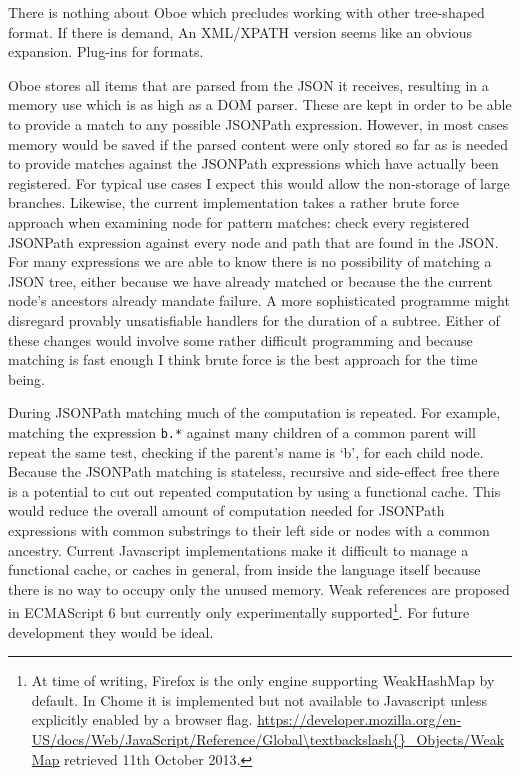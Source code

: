 \documentclass[]{article}
\begin{document}
There is nothing about Oboe which precludes working with other
tree-shaped format. If there is demand, An XML/XPATH version seems like
an obvious expansion. Plug-ins for formats.

Oboe stores all items that are parsed from the JSON it receives,
resulting in a memory use which is as high as a DOM parser. These are
kept in order to be able to provide a match to any possible JSONPath
expression. However, in most cases memory would be saved if the parsed
content were only stored so far as is needed to provide matches against
the JSONPath expressions which have actually been registered. For
typical use cases I expect this would allow the non-storage of large
branches. Likewise, the current implementation takes a rather brute
force approach when examining node for pattern matches: check every
registered JSONPath expression against every node and path that are
found in the JSON. For many expressions we are able to know there is no
possibility of matching a JSON tree, either because we have already
matched or because the the current node's ancestors already mandate
failure. A more sophisticated programme might disregard provably
unsatisfiable handlers for the duration of a subtree. Either of these
changes would involve some rather difficult programming and because
matching is fast enough I think brute force is the best approach for the
time being.

During JSONPath matching much of the computation is repeated. For
example, matching the expression \texttt{b.*} against many children of a
common parent will repeat the same test, checking if the parent's name
is `b', for each child node. Because the JSONPath matching is stateless,
recursive and side-effect free there is a potential to cut out repeated
computation by using a functional cache. This would reduce the overall
amount of computation needed for JSONPath expressions with common
substrings to their left side or nodes with a common ancestry. Current
Javascript implementations make it difficult to manage a functional
cache, or caches in general, from inside the language itself because
there is no way to occupy only the unused memory. Weak references are
proposed in ECMAScript 6 but currently only experimentally
supported\footnote{At time of writing, Firefox is the only engine
  supporting WeakHashMap by default. In Chome it is implemented but not
  available to Javascript unless explicitly enabled by a browser flag.
  \url{https://developer.mozilla.org/en-US/docs/Web/JavaScript/Reference/Global\textbackslash{}_Objects/WeakMap}
  retrieved 11th October 2013.}. For future development they would be
ideal.
\end{document}

